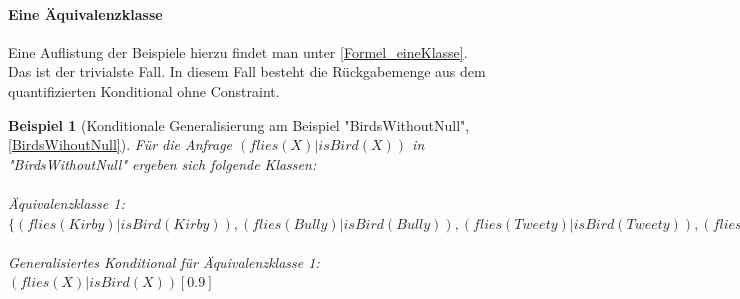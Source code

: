 \documentclass[a4paper, 11pt]{book}
\newtheorem{Bsp}{Beispiel}[section]
\begin{document}
\paragraph{Eine Äquivalenzklasse}
Eine Auflistung der Beispiele hierzu findet man unter \ref{Formel_eineKlasse}.\\
Das ist der trivialste Fall. In diesem Fall besteht die Rückgabemenge aus dem quantifizierten Konditional ohne Constraint.
	\begin{Bsp}[Konditionale Generalisierung am Beispiel "{}BirdsWithoutNull"{}, \ref{BirdsWihoutNull}]
	Für die Anfrage $ (flies(X) | isBird(X))$ in "{}BirdsWithoutNull"{} ergeben sich folgende Klassen:\\
	\\
	Äquivalenzklasse 1: $ \{(flies(Kirby) | isBird(Kirby)), (flies(Bully) | isBird(Bully)), (flies(Tweety) | isBird(Tweety)), (flies(Sylvester) | isBird(Sylvester))\} $\\
	\\
	Generalisiertes Konditional für Äquivalenzklasse 1: $ (flies(X) | isBird(X))[0.9]$
\end{Bsp}
\end{document}
